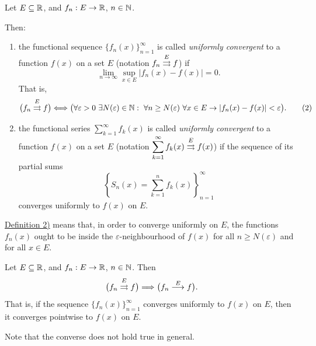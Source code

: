 \begin{definition}\label{def:5.3}
Let $E\subseteq\mathbb{R}$, and $f_n:E\to\mathbb{R}$, $n\in\mathbb{N}$.

Then:
\begin{enumerate}
    \item\label{item:definition:5.3:1} the functional sequence $\{f_n(x)\}_{n=1}^{\infty}$ is called \emph{uniformly convergent} to a function $f(x)$ on a set $E$ (notation $f_n\mathrel{\overset{E}{\rightrightarrows}}f$) if
    \[
    \lim_{n\to\infty}\sup_{x\in E}|f_n(x)-f(x)|=0.
    \]
    That is,
    \[
    \bigl(f_n\mathrel{\overset{E}{\rightrightarrows}}f\bigr)
    \Longleftrightarrow
    \bigl(\forall\varepsilon>0\ \exists N(\varepsilon)\in\mathbb{N}:\ \forall n\ge N(\varepsilon)\ \forall x\in E
    \to |f_n(x)-f(x)|<\varepsilon\bigr).
    \tag{2}\label{eq:5:2:1}
    \]

    \item\label{item:definition:5.3:2} the functional series $\displaystyle\sum_{k=1}^{\infty}f_k(x)$ is called \emph{uniformly convergent} to a function $f(x)$ on a set $E$ (notation $\displaystyle\sum_{k=1}^{\infty}f_k(x)\mathrel{\overset{E}{\rightrightarrows}}f(x)$) if the sequence of its partial sums
    \[
    \left\{S_n(x)=\sum_{k=1}^{n}f_k(x)\right\}_{n=1}^{\infty}
    \]
    converges uniformly to $f(x)$ on $E$.
\end{enumerate}
\end{definition}

\hyperref[item:definition:5.3:2]{Definition 2)} means that, in order to converge uniformly on $E$, the functions $f_n(x)$ ought to be inside the $\varepsilon$-neighbourhood of $f(x)$ for all $n\ge N(\varepsilon)$ and for all $x\in E$.

\begin{claim}\label{claim:5.3}
Let $E\subseteq\mathbb{R}$, and $f_n:E\to\mathbb{R}$, $n\in\mathbb{N}$.
Then
\[
\bigl(f_n\mathrel{\overset{E}{\rightrightarrows}}f\bigr)\Longrightarrow\bigl(f_n\mathrel{\overset{E}{\longrightarrow}}f\bigr).
\]
That is, if the sequence $\{f_n(x)\}_{n=1}^{\infty}$ converges uniformly to $f(x)$ on $E$, then it converges pointwise to $f(x)$ on $E$.

Note that the converse does not hold true in general.
\end{claim}

